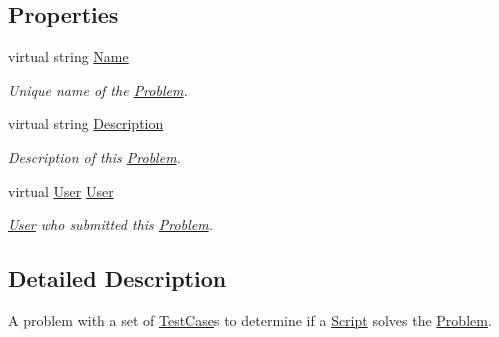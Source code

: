 \subsection*{Properties}
\begin{DoxyCompactItemize}
\item 
virtual string \mbox{\hyperlink{class_code_a_friend_1_1_data_model_1_1_problem_a32bbc148bbaffc060632720e2ab860fb}{Name}}
\begin{DoxyCompactList}\small\item\em Unique name of the \mbox{\hyperlink{class_code_a_friend_1_1_data_model_1_1_problem}{Problem}}.\end{DoxyCompactList}\item 
virtual string \mbox{\hyperlink{class_code_a_friend_1_1_data_model_1_1_problem_a62094d748f4eed72d44f25bdab3047dc}{Description}}
\begin{DoxyCompactList}\small\item\em Description of this \mbox{\hyperlink{class_code_a_friend_1_1_data_model_1_1_problem}{Problem}}.\end{DoxyCompactList}\item 
virtual \mbox{\hyperlink{class_code_a_friend_1_1_data_model_1_1_user}{User}} \mbox{\hyperlink{class_code_a_friend_1_1_data_model_1_1_problem_a16adf7da62fca6b430006e5d0c099c96}{User}}
\begin{DoxyCompactList}\small\item\em \mbox{\hyperlink{class_code_a_friend_1_1_data_model_1_1_user}{User}} who submitted this \mbox{\hyperlink{class_code_a_friend_1_1_data_model_1_1_problem}{Problem}}.\end{DoxyCompactList}\end{DoxyCompactItemize}


\subsection{Detailed Description}
A problem with a set of \mbox{\hyperlink{class_code_a_friend_1_1_data_model_1_1_test_case}{Test\+Case}}s to determine if a \mbox{\hyperlink{class_code_a_friend_1_1_data_model_1_1_script}{Script}} solves the \mbox{\hyperlink{class_code_a_friend_1_1_data_model_1_1_problem}{Problem}}. 



